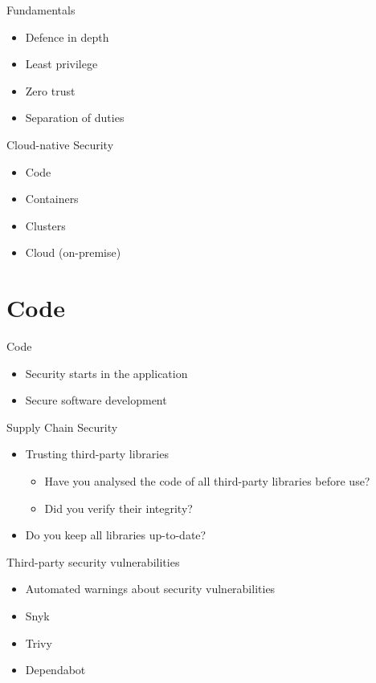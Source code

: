 \documentclass{dcpresentation}
\begin{document}
\begin{frame}{Fundamentals}
 \begin{itemize}
  \item Defence in depth
  \item Least privilege
  \item Zero trust
  \item Separation of duties
 \end{itemize}
\end{frame}

\begin{frame}{Cloud-native Security}
  \begin{itemize}
  \item Code
  \item Containers
  \item Clusters
  \item Cloud (on-premise)
  \end{itemize}
\end{frame}

\section{Code}

\begin{frame}{Code}
  \begin{itemize}
  \item Security starts in the application
  \item Secure software development
  \end{itemize}
\end{frame}

\begin{frame}{Supply Chain Security}
  \begin{itemize}
  \item Trusting third-party libraries
    \begin{itemize}
    \item Have you analysed the code of all third-party libraries before use?
    \item Did you verify their integrity?
    \end{itemize}
  \item Do you keep all libraries up-to-date?
  \end{itemize}
\end{frame}

\begin{frame}{Third-party security vulnerabilities}
  \begin{itemize}
  \item Automated warnings about security vulnerabilities
  \item Snyk
  \item Trivy
  \item Dependabot
  \end{itemize}
\end{frame}
\end{document}
